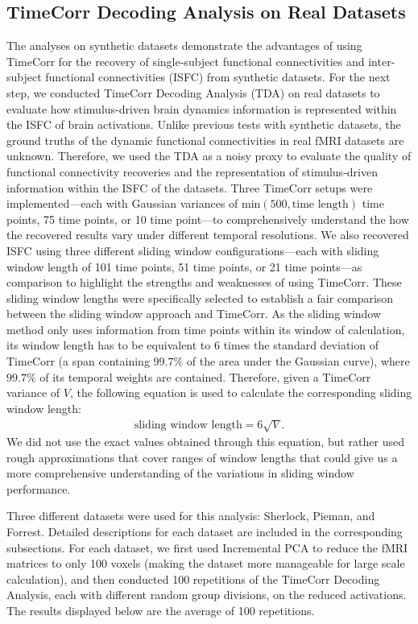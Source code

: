 \documentclass[11pt]{article}
\begin{document}
\subsection{TimeCorr Decoding Analysis on Real Datasets}
The analyses on synthetic datasets demonstrate the advantages of using TimeCorr for the recovery of single-subject functional connectivities and inter-subject functional connectivities (ISFC) from synthetic datasets. For the next step, we conducted TimeCorr Decoding Analysis (TDA) on real datasets to evaluate how stimulus-driven brain dynamics information is represented within the ISFC of brain activations. Unlike previous tests with synthetic datasets, the ground truths of the dynamic functional connectivities in real fMRI datasets are unknown. Therefore, we used the TDA as a noisy proxy to evaluate the quality of functional connectivity recoveries and the representation of stimulus-driven information within the ISFC of the datasets. Three TimeCorr setups were implemented---each with Gaussian variances of $\text{min}(500,\text{time length})$ time points, 75 time points, or 10 time point---to comprehensively understand the how the recovered results vary under different temporal resolutions. We also recovered ISFC using three different sliding window configurations---each with sliding window length of 101 time points, 51 time points, or 21 time points---as comparison to highlight the strengths and weaknesses of using TimeCorr. These sliding window lengths were specifically selected to establish a fair comparison between the sliding window approach and TimeCorr. As the sliding window method only uses information from time points within its window of calculation, its window length has to be equivalent to 6 times the standard deviation of TimeCorr (a span containing $99.7\%$ of the area under the Gaussian curve), where $99.7\%$ of its temporal weights are contained. Therefore, given a TimeCorr variance of $V$, the following equation is used to calculate the corresponding sliding window length:
\begin{align*}
\text{sliding window length} = 6\sqrt{V}.
\end{align*}
We did not use the exact values obtained through this equation, but rather used rough approximations that cover ranges of window lengths that could give us a more comprehensive understanding of the variations in sliding window performance.

Three different datasets were used for this analysis: Sherlock, Pieman, and Forrest. Detailed descriptions for each dataset are included in the corresponding subsections. For each dataset, we first used Incremental PCA to reduce the fMRI matrices to only 100 voxels (making the dataset more manageable for large scale calculation), and then conducted 100 repetitions of the TimeCorr Decoding Analysis, each with different random group divisions, on the reduced activations. The results displayed below are the average of 100 repetitions.
\end{document}
